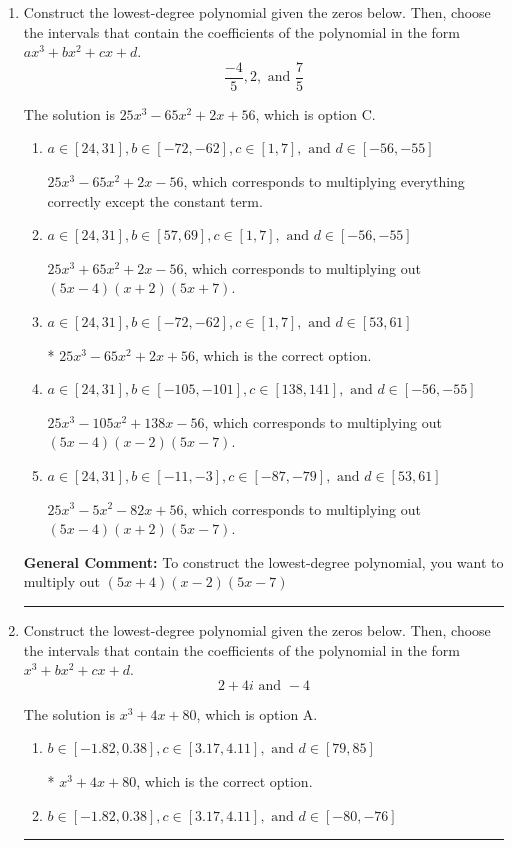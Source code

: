 \documentclass{extbook}[14pt]
\newcommand{\litem}[1]{\item #1

\rule{\textwidth}{0.4pt}}
\begin{document}
\begin{enumerate}\litem{
Construct the lowest-degree polynomial given the zeros below. Then, choose the intervals that contain the coefficients of the polynomial in the form $ax^3+bx^2+cx+d$.
\[ \frac{-4}{5}, 2, \text{ and } \frac{7}{5} \]

The solution is \( 25x^{3} -65 x^{2} +2 x + 56 \), which is option C.\begin{enumerate}[label=\Alph*.]
\item \( a \in [24, 31], b \in [-72, -62], c \in [1, 7], \text{ and } d \in [-56, -55] \)

$25x^{3} -65 x^{2} +2 x -56$, which corresponds to multiplying everything correctly except the constant term.
\item \( a \in [24, 31], b \in [57, 69], c \in [1, 7], \text{ and } d \in [-56, -55] \)

$25x^{3} +65 x^{2} +2 x -56$, which corresponds to multiplying out $(5x -4)(x + 2)(5x + 7)$.
\item \( a \in [24, 31], b \in [-72, -62], c \in [1, 7], \text{ and } d \in [53, 61] \)

* $25x^{3} -65 x^{2} +2 x + 56$, which is the correct option.
\item \( a \in [24, 31], b \in [-105, -101], c \in [138, 141], \text{ and } d \in [-56, -55] \)

$25x^{3} -105 x^{2} +138 x -56$, which corresponds to multiplying out $(5x -4)(x -2)(5x -7)$.
\item \( a \in [24, 31], b \in [-11, -3], c \in [-87, -79], \text{ and } d \in [53, 61] \)

$25x^{3} -5 x^{2} -82 x + 56$, which corresponds to multiplying out $(5x -4)(x + 2)(5x -7)$.
\end{enumerate}

\textbf{General Comment:} To construct the lowest-degree polynomial, you want to multiply out $(5x + 4)(x -2)(5x -7)$
}
\litem{
Construct the lowest-degree polynomial given the zeros below. Then, choose the intervals that contain the coefficients of the polynomial in the form $x^3+bx^2+cx+d$.
\[ 2 + 4 i \text{ and } -4 \]

The solution is \( x^{3} +4 x + 80 \), which is option A.\begin{enumerate}[label=\Alph*.]
\item \( b \in [-1.82, 0.38], c \in [3.17, 4.11], \text{ and } d \in [79, 85] \)

* $x^{3} +4 x + 80$, which is the correct option.
\item \( b \in [-1.82, 0.38], c \in [3.17, 4.11], \text{ and } d \in [-80, -76] \)


\end{enumerate}}
\end{enumerate}
\end{document}
